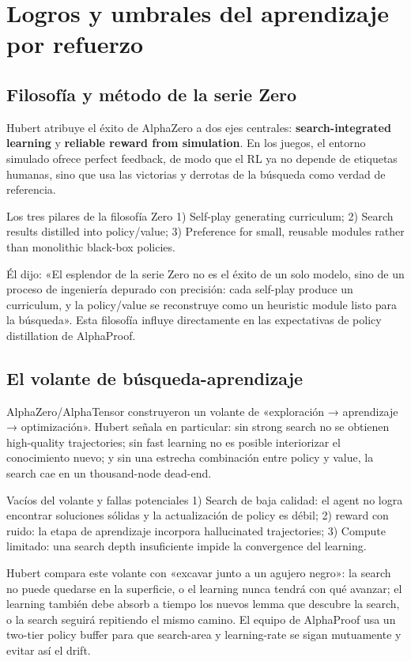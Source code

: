 \section{Logros y umbrales del aprendizaje por refuerzo}

\subsection{Filosofía y método de la serie Zero}
Hubert atribuye el éxito de AlphaZero a dos ejes centrales: \textbf{search-integrated learning} y \textbf{reliable reward from simulation}. En los juegos, el entorno simulado ofrece perfect feedback, de modo que el RL ya no depende de etiquetas humanas, sino que usa las victorias y derrotas de la búsqueda como verdad de referencia.
\begin{knowledgebox}{Los tres pilares de la filosofía Zero}
1) Self-play generating curriculum; 2) Search results distilled into policy/value; 3) Preference for small, reusable modules rather than monolithic black-box policies.
\end{knowledgebox}

Él dijo: «El esplendor de la serie Zero no es el éxito de un solo modelo, sino de un proceso de ingeniería depurado con precisión: cada self-play produce un curriculum, y la policy/value se reconstruye como un heuristic module listo para la búsqueda». Esta filosofía influye directamente en las expectativas de policy distillation de AlphaProof.

\subsection{El volante de búsqueda-aprendizaje}
AlphaZero/AlphaTensor construyeron un volante de «exploración → aprendizaje → optimización». Hubert señala en particular: sin strong search no se obtienen high-quality trajectories; sin fast learning no es posible interiorizar el conocimiento nuevo; y sin una estrecha combinación entre policy y value, la search cae en un thousand-node dead-end.
\begin{warningbox}{Vacíos del volante y fallas potenciales}
1) Search de baja calidad: el agent no logra encontrar soluciones sólidas y la actualización de policy es débil; 2) reward con ruido: la etapa de aprendizaje incorpora hallucinated trajectories; 3) Compute limitado: una search depth insuficiente impide la convergence del learning.
\end{warningbox}

Hubert compara este volante con «excavar junto a un agujero negro»: la search no puede quedarse en la superficie, o el learning nunca tendrá con qué avanzar; el learning también debe absorb a tiempo los nuevos lemma que descubre la search, o la search seguirá repitiendo el mismo camino. El equipo de AlphaProof usa un two-tier policy buffer para que search-area y learning-rate se sigan mutuamente y evitar así el drift.

